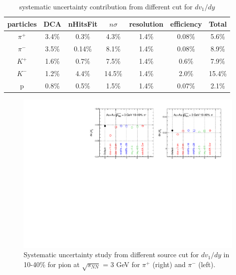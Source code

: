 \begin{table}[]
    \centering
    \begin{tabular}{|c|c|c|c|c|c|c|}
    \hline
        particles & DCA & nHitsFit & $n\sigma$ & resolution & efficiency & Total \\ \hline
        $\pi^{+}$ & 3.4\% & 0.3\% & 4.3\% & 1.4\% & 0.08\% & 5.6\% \\ 
        $\pi^{-}$ & 3.5\% &0.14\% & 8.1\% & 1.4\% & 0.08\% & 8.9\% \\ 
        $K^{+}$   & 1.6\% & 0.7\% & 7.5\% & 1.4\% &  0.6\% & 7.9\% \\ 
        $K^{-}$   & 1.2\% & 4.4\% &14.5\% & 1.4\% &  2.0\% &15.4\% \\ 
        p         & 0.8\% & 0.5\% & 1.5\% & 1.4\% & 0.07\% & 2.1\% \\ 
        \hline
    \end{tabular}
    \caption{systematic uncertainty contribution from different cut for $dv_{1}/dy$}
    \label{tab:syserr_dv1dy}
\end{table}

\begin{figure}[h]
\includegraphics[scale=0.8]{FXT3gev/chapter3/fig/sys/pion/dv1y_pion_sys.pdf}
\caption{Systematic uncertainty study from different source cut for $dv_{1}/dy$ in 10-40\% for pion at $\sqrt{s_{NN}}$ = 3 GeV for $\pi^{+}$ (right) and $\pi^{-}$ (left).}
\label{fig:pion_dv1y_sys}
\end{figure}

